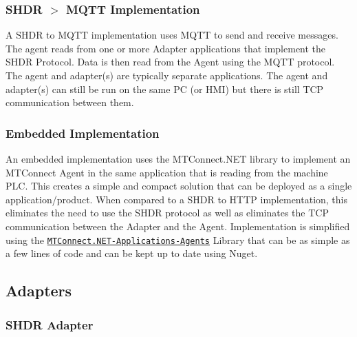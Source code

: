 \subsubsection*{S\+H\+DR $>$ M\+Q\+TT Implementation}

A S\+H\+DR to M\+Q\+TT implementation uses M\+Q\+TT to send and receive messages. The agent reads from one or more Adapter applications that implement the S\+H\+DR Protocol. Data is then read from the Agent using the M\+Q\+TT protocol. The agent and adapter(s) are typically separate applications. The agent and adapter(s) can still be run on the same PC (or H\+MI) but there is still T\+CP communication between them.



\subsubsection*{Embedded Implementation}

An embedded implementation uses the M\+T\+Connect.\+N\+ET library to implement an M\+T\+Connect Agent in the same application that is reading from the machine P\+LC. This creates a simple and compact solution that can be deployed as a single application/product. When compared to a S\+H\+DR to H\+T\+TP implementation, this eliminates the need to use the S\+H\+DR protocol as well as eliminates the T\+CP communication between the Adapter and the Agent. Implementation is simplified using the \href{https://github.com/TrakHound/MTConnect.NET/tree/master/src/MTConnect.NET-Applications-Agents}{\tt M\+T\+Connect.\+N\+ET-\/\+Applications-\/\+Agents} Library that can be as simple as a few lines of code and can be kept up to date using Nuget.



\subsection*{Adapters}

\subsubsection*{S\+H\+DR Adapter}

